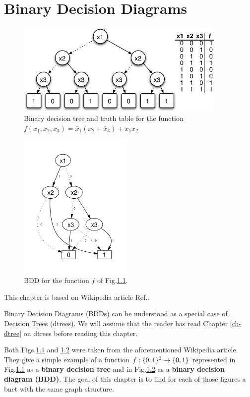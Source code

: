 \chapter{Binary Decision Diagrams}\label{ch-binarydd}

\begin{figure}[h!]
\centering
\includegraphics[width=4in]{binarydd/bdd-tree.png}
\caption{Binary decision tree and truth table 
for the function $
f(x_1, x_2,x_3)=
\bar{x}_1(x_2+\bar{x}_3)  + x_1 x_2 $ }
\label{fig-bdd-tree}
\end{figure}

\begin{figure}[h!]
\centering
\includegraphics[width=2.2in]{binarydd/bdd.png}
\caption{BDD for the function $f$
of Fig.\ref{fig-bdd-tree}.} 
\label{fig-bdd-bdd}
\end{figure}

This chapter is based
on Wikipedia article Ref.\cite{wiki-bdd}.

Binary Decision Diagrams (BDDs)
can be understood as a special
case of Decision Trees (dtrees).
We will
assume
that the reader has read
Chapter \ref{ch-dtree} 
on dtrees before
reading this chapter.



Both Figs.\ref{fig-bdd-tree}
and \ref{fig-bdd-bdd} were taken
from the aforementioned Wikipedia article. They
give a simple example of a function
$f:\{0,1\}^3\rightarrow\{0,1\}$
represented in
Fig.\ref{fig-bdd-tree} as a
{\bf binary decision tree}
 and in Fig.\ref{fig-bdd-bdd} as a {\bf binary
decision diagram (BDD)}.
The goal 
of this chapter is
to find for each  of those 
figures a bnet with
the same graph structure.

